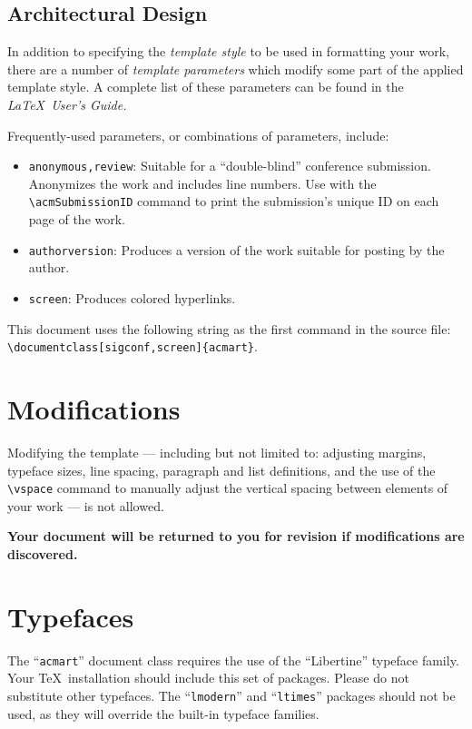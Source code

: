 \documentclass[sigconf]{acmart}
\begin{document}
\subsection{Architectural Design}

In addition to specifying the {\it template style} to be used in formatting your work, there are a number of {\it template parameters} which modify some part of the applied template style. A complete list of these parameters can be found in the {\it \LaTeX\ User's Guide.}

Frequently-used parameters, or combinations of parameters, include:
\begin{itemize}
\item {\verb|anonymous,review|}: Suitable for a ``double-blind'' conference submission. Anonymizes the work and includes line numbers. Use with the \verb|\acmSubmissionID| command to print the submission's unique ID on each page of the work.
\item{\verb|authorversion|}: Produces a version of the work suitable for posting by the author.
\item{\verb|screen|}: Produces colored hyperlinks.
\end{itemize}

This document uses the following string as the first command in the source file: \verb|\documentclass[sigconf,screen]{acmart}|.

\section{Modifications}

Modifying the template --- including but not limited to: adjusting margins, typeface sizes, line spacing, paragraph and list definitions, and the use of the \verb|\vspace| command to manually adjust the vertical spacing between elements of your work --- is not allowed.

{\bf Your document will be returned to you for revision if modifications are discovered.}

\section{Typefaces}

The ``\verb|acmart|'' document class requires the use of the ``Libertine'' typeface family. Your \TeX\ installation should include this set of packages. Please do not substitute other typefaces. The ``\verb|lmodern|'' and ``\verb|ltimes|'' packages should not be used, as they will override the built-in typeface families.
\end{document}
